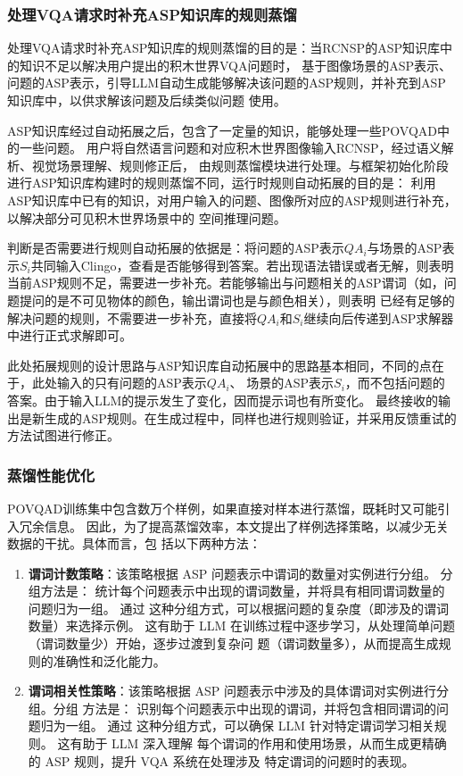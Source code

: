 \subsubsection{处理VQA请求时补充ASP知识库的规则蒸馏}
处理VQA请求时补充ASP知识库的规则蒸馏的目的是：当RCNSP的ASP知识库中的知识不足以解决用户提出的积木世界VQA问题时，
基于图像场景的ASP表示、问题的ASP表示，引导LLM自动生成能够解决该问题的ASP规则，并补充到ASP知识库中，以供求解该问题及后续类似问题
使用。

ASP知识库经过自动拓展之后，包含了一定量的知识，能够处理一些POVQAD中的一些问题。
用户将自然语言问题和对应积木世界图像输入RCNSP，经过语义解析、视觉场景理解、规则修正后，
由规则蒸馏模块进行处理。与框架初始化阶段进行ASP知识库构建时的规则蒸馏不同，运行时规则自动拓展的目的是：
利用ASP知识库中已有的知识，对用户输入的问题、图像所对应的ASP规则进行补充，以解决部分可见积木世界场景中的
空间推理问题。

判断是否需要进行规则自动拓展的依据是：将问题的ASP表示$QA_i$与场景的ASP表示$S_i$共同输入Clingo，查看是否能够得到答案。若出现语法错误或者无解，则表明
当前ASP规则不足，需要进一步补充。若能够输出与问题相关的ASP谓词（如，问题提问的是不可见物体的颜色，输出谓词也是与颜色相关），则表明
已经有足够的解决问题的规则，不需要进一步补充，直接将$QA_i$和$S_i$继续向后传递到ASP求解器中进行正式求解即可。

此处拓展规则的设计思路与ASP知识库自动拓展中的思路基本相同，不同的点在于，此处输入的只有问题的ASP表示$QA_i$、
场景的ASP表示$S_i$，而不包括问题的答案。由于输入LLM的提示发生了变化，因而提示词也有所变化。
最终接收的输出是新生成的ASP规则。在生成过程中，同样也进行规则验证，并采用反馈重试的方法试图进行修正。
\subsubsection{蒸馏性能优化}
POVQAD训练集中包含数万个样例，如果直接对样本进行蒸馏，既耗时又可能引入冗余信息。
因此，为了提高蒸馏效率，本文提出了样例选择策略，以减少无关数据的干扰。具体而言，包
括以下两种方法：
\begin{enumerate}[nosep]
\item \textbf{谓词计数策略}：该策略根据 ASP 问题表示中谓词的数量对实例进行分组。 分组方法是：
统计每个问题表示中出现的谓词数量，并将具有相同谓词数量的问题归为一组。 通过
这种分组方式，可以根据问题的复杂度（即涉及的谓词数量）来选择示例。 这有助于
LLM 在训练过程中逐步学习，从处理简单问题（谓词数量少）开始，逐步过渡到复杂问
题（谓词数量多），从而提高生成规则的准确性和泛化能力。
\item \textbf{谓词相关性策略}：该策略根据 ASP 问题表示中涉及的具体谓词对实例进行分组。分组
方法是： 识别每个问题表示中出现的谓词，并将包含相同谓词的问题归为一组。 通过
这种分组方式，可以确保 LLM 针对特定谓词学习相关规则。 这有助于 LLM 深入理解
每个谓词的作用和使用场景，从而生成更精确的 ASP 规则，提升 VQA 系统在处理涉及
特定谓词的问题时的表现。
\end{enumerate}

